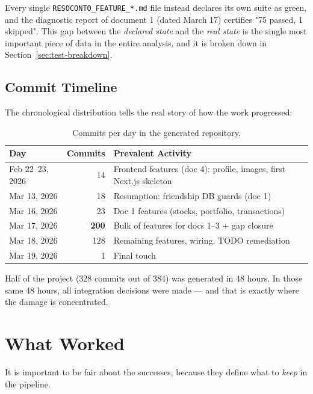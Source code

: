 \documentclass[11pt,a4paper]{article}
\newcommand{\warn}[1]{\textcolor{warnorange}{\textbf{#1}}}
\newcommand{\file}[1]{\texttt{\small #1}}
\begin{document}
	Every single \file{RESOCONTO\_FEATURE\_*.md} file instead declares its own suite as green, and the diagnostic report of document 1 (dated March 17) certifies "75 passed, 1 skipped". This gap between the \emph{declared state} and the \emph{real state} is the single most important piece of data in the entire analysis, and it is broken down in Section~\ref{sec:test-breakdown}.
	
	\subsection{Commit Timeline}
	The chronological distribution tells the real story of how the work progressed:
	
	\begin{table}[h!]
		\centering
		\small
		\begin{tabular}{lrl}
			\toprule
			\textbf{Day} & \textbf{Commits} & \textbf{Prevalent Activity} \\
			\midrule
			Feb 22--23, 2026 & 14 & Frontend features (doc 4): profile, images, first Next.js skeleton \\
			Mar 13, 2026 & 18 & Resumption: friendship DB guards (doc 1) \\
			Mar 16, 2026 & 23 & Doc 1 features (stocks, portfolio, transactions) \\
			Mar 17, 2026 & \warn{200} & Bulk of features for docs 1--3 + gap closure \\
			Mar 18, 2026 & 128 & Remaining features, wiring, TODO remediation \\
			Mar 19, 2026 & 1 & Final touch \\
			\bottomrule
		\end{tabular}
		\caption{Commits per day in the generated repository.}
	\end{table}
	
	Half of the project (328 commits out of 384) was generated in 48 hours. In those same 48 hours, all integration decisions were made --- and that is exactly where the damage is concentrated.
	
	\section{What Worked}
	
	It is important to be fair about the successes, because they define what to \emph{keep} in the pipeline.
	
\end{document}
